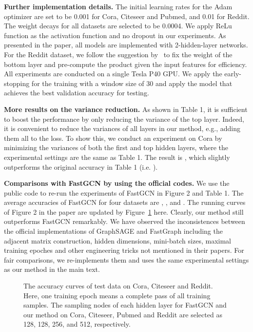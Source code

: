 \documentclass{article}
\begin{document}
\textbf{Further implementation details.} The initial learning rates for the Adam optimizer are set to be 0.001 for Cora, Citeseer and Pubmed, and 0.01 for Reddit. The weight decays for all datasets are selected to be 0.0004. We apply ReLu function as the activation function and  no dropout in our experiments. As presented in the paper, all models are implemented with 2-hidden-layer networks. For the Reddit dataset, we follow the suggestion by~\cite{chen2018fastgcn} to fix the weight of the bottom layer and pre-compute the product  given the input features for  efficiency. All experiments are conducted on a single Tesla P40 GPU. We apply the early-stopping for the training with a window size of 30 and apply the model that achieves the best validation accuracy for testing.


\textbf{More results on the variance reduction.}
As shown in Table 1, it is sufficient to boost the performance by only reducing the variance of the top layer. Indeed, it is convenient to reduce the variances of all layers in our method, e.g., adding them all to the loss. To show this, we conduct an experiment on Cora by minimizing the variances of both the first and top hidden layers, where the experimental settings are the same as Table 1. The result is , which slightly outperforms the original accuracy in Table 1 (i.e. ).

\textbf{Comparisons with FastGCN by using the official codes.}
We use the public code to re-run the experiments of FastGCN in Figure 2 and Table 1. The average accuracies of FastGCN for four datasets are , ,  and . The running curves of Figure 2 in the paper are updated by Figure~\ref{Fig:sampling} here. Clearly, our method still outperforms FastGCN remarkably. We have observed the inconsistences between the official implementations of GraphSAGE and FastGraph including the adjacent matrix construction, hidden dimensions, mini-batch sizes, maximal training epoches and other engineering tricks not mentioned in their papers. For fair comparisons, we re-implements them and uses the same experimental settings as our method in the main text.

\begin{figure}[!h]
\begin{center}
\vskip -0.15in
\caption{The accuracy curves of test data on Cora, Citeseer and Reddit. Here, one training epoch means a complete pass of all training samples. The sampling nodes of each hidden layer for FastGCN and our method on Cora, Citeseer, Pubmed and Reddit are selected as 128, 128, 256, and 512, respectively.}
\label{Fig:sampling}
\end{center}
\vskip -0.2in
\end{figure}
\end{document}
